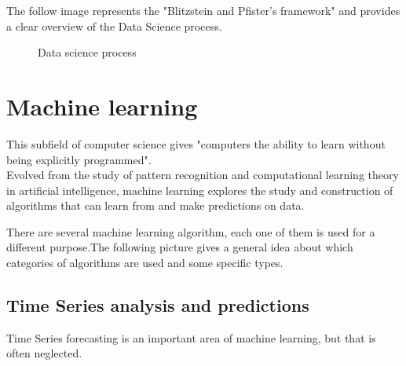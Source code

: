 The follow image represents the "Blitzstein and Pfister's framework" and provides a clear overview of the Data Science process.\\

\begin{figure}[H]
    \centering
    \caption[Data science process]{Data science process}
    \label{fig: Data_science}
\end{figure}



\newpage


\section{Machine learning}
This subfield of computer science gives "computers the ability to learn without being explicitly programmed". \\Evolved from the study of pattern recognition and computational learning theory in artificial intelligence, machine learning explores the study and construction of algorithms that can learn from and make predictions on data.

There are several machine learning algorithm, each one of them is used for a different purpose.The following picture gives a general idea about which categories of algorithms are used and some specific types.


\subsection{Time Series analysis and predictions}
Time Series forecasting is an important area of machine learning, but that is often neglected.

